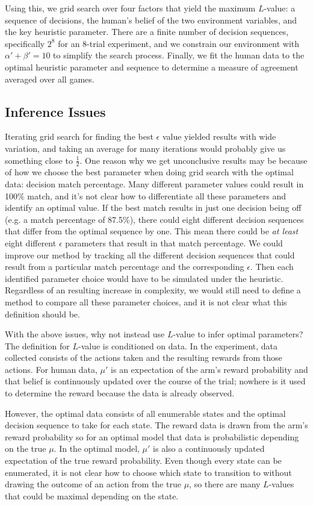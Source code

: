 Using this, we grid search over four factors that yield the maximum $L$-value: a sequence of decisions, the human's belief of the two environment variables, and the key heuristic parameter. There are a finite number of decision sequences, specifically $2^8$ for an 8-trial experiment, and we constrain our environment with $\alpha'+\beta'=10$ to simplify the search process. Finally, we fit the human data to the optimal heuristic parameter and sequence to determine a measure of agreement averaged over all games.



\subsection{Inference Issues}
Iterating grid search for finding the best $\epsilon$ value yielded results with wide variation, and taking an average for many iterations would probably give us something close to $\frac{1}{2}$. One reason why we get unconclusive results may be because of how we choose the best parameter when doing grid search with the optimal data: decision match percentage. Many different parameter values could result in 100\% match, and it's not clear how to differentiate all these parameters and identify an optimal value. If the best match results in just one decision being off (e.g. a match percentage of 87.5\%), there could eight different decision sequences that differ from the optimal sequence by one. This mean there could be \textit{at least} eight different $\epsilon$ parameters that result in that match percentage. We could improve our method by tracking all the different decision sequences that could result from a particular match percentage and the corresponding $\epsilon$. Then each identified parameter choice would have to be simulated under the heuristic. Regardless of an resulting increase in complexity, we would still need to define a method to compare all these parameter choices, and it is not clear what this definition should be.

With the above issues, why not instead use $L$-value to infer optimal parameters? The definition for $L$-value is conditioned on data. In the experiment, data collected consists of the actions taken and the resulting rewards from those actions. For human data, $\mu'$ is an expectation of the arm's reward probability and that belief is continuously updated over the course of the trial; nowhere is it used to determine the reward because the data is already observed. 

However, the optimal data consists of all enumerable states and the optimal decision sequence to take for each state. The reward data is drawn from the arm's reward probability so for an optimal model that data is probabilistic depending on the true $\mu$. In the optimal model, $\mu'$ is also a continuously updated expectation of the true reward probability. Even though every state can be enumerated, it is not clear how to choose which state to transition to without drawing the outcome of an action from the true $\mu$, so there are many $L$-values that could be maximal depending on the state.


